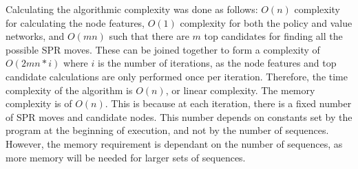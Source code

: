 \documentclass{mpaper}
\begin{document}
Calculating the algorithmic complexity was done as follows: $O(n)$ complexity for calculating the node features, $O(1)$ complexity for both the policy and value networks, and $O(mn)$ such that there are $m$ top candidates for finding all the possible SPR moves. These can be joined together to form a complexity of $O(2mn*i)$ where $i$ is the number of iterations, as the node features and top candidate calculations are only performed once per iteration. Therefore, the time complexity of the algorithm is $O(n)$, or linear complexity. The memory complexity is of $O(n)$. This is because at each iteration, there is a fixed number of SPR moves and candidate nodes. This number depends on constants set by the program at the beginning of execution, and not by the number of sequences. However, the memory requirement is dependant on the number of sequences, as more memory will be needed for larger sets of sequences.

\begin{algorithm}
    \removelatexerror%

    \DontPrintSemicolon
\end{algorithm}
\end{document}
